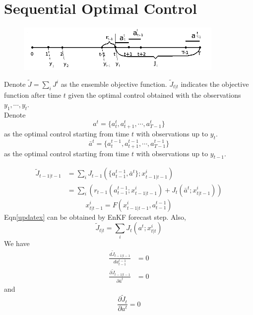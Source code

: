 \documentclass[a4paper,onecolumn]{article}
\begin{document}
\section{Sequential Optimal Control}
\begin{figure}
\begin{center}
\includegraphics[width=10cm]{time_notation.png}
\end{center}
\end{figure}
Denote $\tilde{J} = \sum_i{J^i}$ as the ensemble objective function.
$\tilde{J}_{t|t}$ indicates the objective function after time $t$ given
the optimal control obtained with the observations $y_1,\cdots,y_t$.\\

\noindent Denote
$$
    a^t = \{a_t^t, a_{t+1}^t, \cdots, a_{T-1}^t\}
$$
as the optimal control starting from time $t$ with observations up to
$y_t$.
$$
    \bar{a}^t = \{a_t^{t-1}, a_{t+1}^{t-1}, \cdots, a_{T-1}^{t-1}\}
$$
as the optimal control starting from time $t$ with observations up to
$y_{t-1}$.

\begin{equation}\begin{split}
    \tilde{J}_{t-1|t-1} &= \sum_i J_{t-1}\left( \{a^{t-1}_{t-1},
	\bar{a}^{t}\}; x^i_{t-1|t-1}\right)\\
	&= \sum_i \left(
	    r_{t-1}(a_{t-1}^{t-1}; x_{t-1|t-1}^i) + J_t\left(
		    \bar{a}^t; x_{t|t-1}^i
		\right)
	\right)
\end{split}\end{equation}
\begin{equation}
    x_{t|t-1}^i = F(x_{t-1|t-1}^i, a_{t-1}^{t-1})
	\label{updatex}
\end{equation}
Eqn\eqref{updatex} can be obtained by EnKF forecast step.
Also,
\begin{equation}
    \tilde{J}_{t|t} = \sum_i J_t\left(
	    a^t; x^i_{t|t}
	\right)
\end{equation}
We have
\begin{equation}\begin{split}
    \frac{d\tilde{J}_{t-1|t-1}}{d a_{t-1}^{t-1}} &= 0\\
	\frac{\partial \tilde{J}_{t-1|t-1}}{\partial \bar{a}^t} &= 0
\end{split}\end{equation}
and
\begin{equation}
    \frac{\partial \tilde{J}_t}{\partial a^t} = 0
\end{equation}
\end{document}
